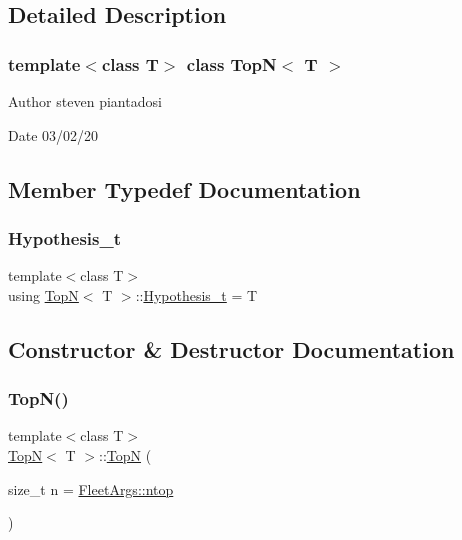 \subsection{Detailed Description}
\subsubsection*{template$<$class T$>$\newline
class Top\+N$<$ T $>$}

\begin{DoxyAuthor}{Author}
steven piantadosi 
\end{DoxyAuthor}
\begin{DoxyDate}{Date}
03/02/20 
\end{DoxyDate}


\subsection{Member Typedef Documentation}
\mbox{\label{class_top_n_ae734a8791a54516fecbc8cac2c67d16a}} 
\subsubsection{\texorpdfstring{Hypothesis\+\_\+t}{Hypothesis\_t}}
{\footnotesize\ttfamily template$<$class T$>$ \\
using \hyperlink{class_top_n}{TopN}$<$ T $>$\+::\hyperlink{class_top_n_ae734a8791a54516fecbc8cac2c67d16a}{Hypothesis\+\_\+t} =  T}



\subsection{Constructor \& Destructor Documentation}
\mbox{\label{class_top_n_aa8c18f3b2b9a26256a71dcc619052639}} 
\subsubsection{\texorpdfstring{Top\+N()}{TopN()}\hspace{0.1cm}{\footnotesize\ttfamily [1/3]}}
{\footnotesize\ttfamily template$<$class T$>$ \\
\hyperlink{class_top_n}{TopN}$<$ T $>$\+::\hyperlink{class_top_n}{TopN} (\begin{DoxyParamCaption}\item[{size\+\_\+t}]{n = {\ttfamily \hyperlink{namespace_fleet_args_acbc0f011abb2f878bf68a85617d8c183}{Fleet\+Args\+::ntop}} }\end{DoxyParamCaption})\hspace{0.3cm}{\ttfamily [inline]}}

